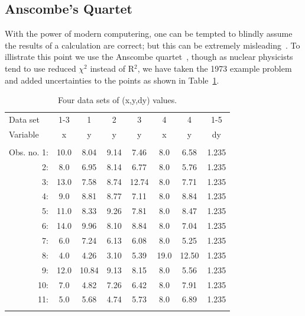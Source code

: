 \documentclass[10pt,aps,prc,twocolumn]{revtex4-1}
\begin{document}
\begin{appendix}

\section{Anscombe's Quartet}

With the power of modern computering, one can be tempted to blindly assume the results of
a calculation are correct; but this can be extremely misleading~\cite{Sirca:2012}.  To illistrate
this point we use the Anscombe quartet~\cite{Anscombe:1973}, though as nuclear physicists tend 
to use reduced $\chi^2$ instead of R$^2$, we have taken the 1973 example
problem and added uncertainties to the points as shown in Table~\ref{quartet}.

\begin{table}[htb]
\caption{Four data sets of (x,y,dy) values.}
\begin{tabular}{rccccccc}
\multicolumn{1}{l}{Data set}    & 1-3  & 1    & 2    & 3    & 4   & 4    & 1-5   \\
\multicolumn{1}{l}{Variable}    & x    & y    & y    & y    & x   & y    & dy    \\  
                                &      &      &      &      &     &      &       \\
Obs. no. 1: & 10.0 & 8.04 & 9.14 & 7.46 & 8.0 & 6.58 & 1.235 \\ 
         2: &  8.0 & 6.95 & 8.14 & 6.77 & 8.0 & 5.76 & 1.235 \\
         3: & 13.0 & 7.58 & 8.74 &12.74 & 8.0 & 7.71 & 1.235 \\
         4: &  9.0 & 8.81 & 8.77 & 7.11 & 8.0 & 8.84 & 1.235 \\
         5: & 11.0 & 8.33 & 9.26 & 7.81 & 8.0 & 8.47 & 1.235 \\
         6: & 14.0 & 9.96 & 8.10 & 8.84 & 8.0 & 7.04 & 1.235 \\
         7: &  6.0 & 7.24 & 6.13 & 6.08 & 8.0 & 5.25 & 1.235 \\
         8: &  4.0 & 4.26 & 3.10 & 5.39 &19.0 &12.50 & 1.235 \\
         9: & 12.0 &10.84 & 9.13 & 8.15 & 8.0 & 5.56 & 1.235 \\
        10: &  7.0 & 4.82 & 7.26 & 6.42 & 8.0 & 7.91 & 1.235 \\
        11: &  5.0 & 5.68 & 4.74 & 5.73 & 8.0 & 6.89 & 1.235 \\ 
            &      &      &      &      &     &      &       \\ \hline
\end{tabular}
\label{quartet}
\end{table}


\end{appendix}
\end{document}
